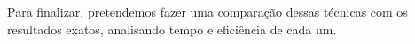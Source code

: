 \documentclass[12pt]{article}
\begin{document}
Para finalizar, pretendemos fazer uma comparação dessas técnicas com os resultados exatos, analisando tempo e eficiência de cada um. 











\end{document}
